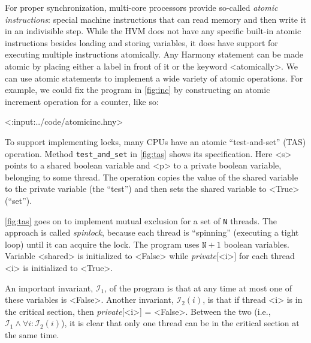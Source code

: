 \documentclass{report}
\newenvironment{code}{
\tcolorbox
}{
\endtcolorbox
}
\begin{document}
%
For proper synchronization, multi-core processors provide so-called
\emph{atomic instructions}: %
special machine instructions
that can read memory and then write it in an indivisible step.
%
While the HVM does not have any specific built-in atomic instructions
besides loading and storing variables,
it does have support for executing multiple instructions atomically.
Any Harmony statement can be made atomic by placing either a label in front
of it or the keyword <{atomically}>.
We can use atomic statements to implement a wide variety of
atomic operations.
For example, we could fix the program in \autoref{fig:inc} by
constructing an atomic increment operation for a counter, like so:
\begin{code}
<{:input:../code/atomicinc.hny}>
\end{code}

To support implementing locks,
many CPUs have an atomic ``test-and-set'' (TAS)
%
%
operation.
Method \texttt{test\_and\_set} in \autoref{fig:tas} shows its specification.
Here <{s}> points to a shared boolean variable and <{p}>
to a private boolean variable, belonging to some thread.
The operation copies the value of the shared variable to the
private variable (the ``test'')
and then sets the shared variable to <{True}> (``set'').

\autoref{fig:tas} goes on to implement mutual exclusion for
a set of \texttt{N} threads.
The approach is called \emph{spinlock},
%
because each thread is ``spinning'' (executing a tight loop) until
it can acquire the lock.
The program uses $\mathtt{N}+1$ boolean variables.
Variable <{shared}> is initialized to <{False}> while
\textit{private}[<{i}>] for each thread <{i}> is initialized to <{True}>.

An important invariant, $\mathcal{I}_1$, of the program is that at any time at most
one of these variables is <{False}>.
Another invariant, $\mathcal{I}_2(i)$, is that if thread <{i}> is
in the critical section,
then \textit{private}[<{i}>] = <{False}>.
Between the two (i.e., $\mathcal{I}_1 \land \forall i: \mathcal{I}_2(i)$),
it is clear that only one thread can be in the
critical section at the same time.
\end{document}
